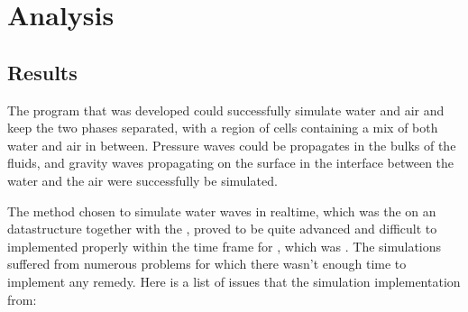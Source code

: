 \part{Analysis}

\chapter{Results}


The program that was developed could successfully simulate water and air and keep the two phases separated, with a region of cells containing a mix of both water and air in between. Pressure waves could be propagates in the bulks of the fluids, and gravity waves propagating on the surface in the interface between the water and the air were successfully be simulated.


The method chosen to simulate water waves in realtime, which was the \FVM on an \octree datastructure together with the \VOF, proved to be quite advanced and difficult to implemented properly within the time frame for \thismasterthesiswork, which was \masterthesisworktime. The simulations suffered from numerous problems for which there wasn't enough time to implement any remedy. Here is a list of issues that the simulation implementation from:



